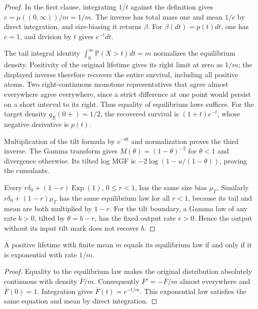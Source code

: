 \begin{proof}
In the first clause, integrating $1/t$ against the definition gives
$c=\mu((0,\infty))/m=1/m$.  The inverse has total mass one and
mean $1/c$ by direct integration, and size-biasing it returns
$\beta$.  For $\beta(dt)=p(t)dt$, one has $c=1$, and division by
$t$ gives $e^{-t}dt$.

The tail integral identity $\int_0^\infty\mathbb P(X>t)dt=m$
normalizes the equilibrium density.  Positivity of the original
lifetime gives its right limit at zero as $1/m$; the displayed
inverse therefore recovers the entire survival, including all
positive atoms.  Two right-continuous monotone representatives
that agree almost everywhere agree everywhere, since a strict
difference at one point would persist on a short interval to its
right.  Thus equality of equilibrium laws suffices.  For the target
density $q_E(0+)=1/2$, the recovered survival is
$(1+t)e^{-t}$, whose negative derivative is $p(t)$.

Multiplication of the tilt formula by $e^{-\theta t}$ and
normalization proves the third inverse.  The Gamma transform gives
$M(\theta)=(1-\theta)^{-2}$ for $\theta<1$ and divergence otherwise.
Its tilted log MGF is
$-2\log(1-u/(1-\theta))$, proving the cumulants.

Every $r\delta_0+(1-r)\operatorname{Exp}(1)$, $0\leq r<1$, has
the same size bias $\mu_\Gamma$.  Similarly
$r\delta_0+(1-r)\mu_\Gamma$ has the same equilibrium law for all
$r<1$, because its tail and mean are both multiplied by $1-r$.
For the tilt boundary, a Gamma law of any rate $b>0$, tilted by
$\theta=b-r$, has the fixed output rate $r>0$.  Hence the output
without its input tilt mark does not recover $b$.
\end{proof}

\begin{corollary}
\label{final:P5-equilibrium-fixed}
A positive lifetime with finite mean $m$ equals its equilibrium law
if and only if it is exponential with rate $1/m$.
\end{corollary}
\begin{proof}
Equality to the equilibrium law makes the original distribution
absolutely continuous with density $\overline F/m$.
Consequently $\overline F'=-\overline F/m$ almost everywhere and
$\overline F(0)=1$.  Integration gives $\overline F(t)=e^{-t/m}$.
This exponential law satisfies the same equation and mean by direct
integration.
\end{proof}

